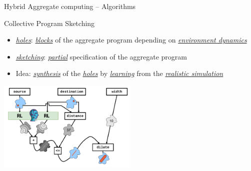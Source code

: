 \documentclass[presentation, 9pt,169]{beamer}\mode<presentation>{\usetheme{AMSBolognaFC}}
\begin{document}
\begin{frame}{Hybrid Aggregate computing -- Algorithms}
  \begin{exampleblock}{Collective Program Sketching~\cite{DBLP:conf/coordination/AguzziCV22}}
    \begin{itemize}
      \item \emph{\underline{holes}}: \emph{\underline{blocks}} of the aggregate program depending on \emph{\underline{environment dynamics}}
      \item \emph{\underline{sketching}}: \emph{\underline{partial}} specification of the aggregate program
      \item Idea: \emph{\underline{synthesis}} of the \emph{\underline{holes}} by \emph{\underline{learning}} from the \emph{\underline{realistic simulation}}
    \end{itemize}
    \begin{center}
    \includegraphics[width=0.5\textwidth]{img/synthesis-3.png}
    \end{center}
  \end{exampleblock}
\end{frame}
\end{document}
